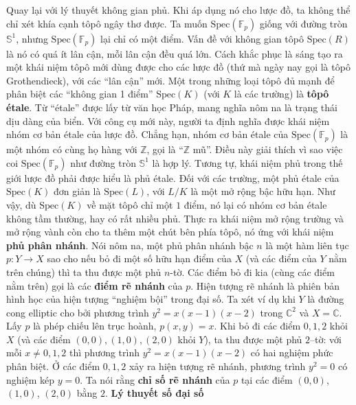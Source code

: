 \begin{multicols}{2}
	Quay lại với lý thuyết không gian phủ. Khi áp dụng nó cho lược đồ, ta không thể chỉ xét khía cạnh tôpô ngây thơ được. Ta muốn $\text{Spec}(\mathbb{F}_p)$ giống với đường tròn $\mathbb{S}^1$, nhưng $\text{Spec}(\mathbb{F}_p)$ lại chỉ có một điểm. Vấn đề với không gian tôpô $\text{Spec}(R)$ là nó có quá ít lân cận, mỗi lân cận đều quá lớn. Cách khắc phục là sáng tạo ra một khái niệm tôpô mới dùng được cho các lược đồ (thứ mà ngày nay gọi là tôpô Grothendieck), với các ``lân cận'' mới. Một trong những loại tôpô đủ mạnh để phân biệt các ``không gian 1 điểm'' $\text{Spec}(K)$ (với $K$ là các trường) là {\bf\color{duongvaotoanhoc} tôpô étale}. Từ ``étale'' được lấy từ văn học Pháp, mang nghĩa nôm na là trạng thái dịu dàng của biển. Với công cụ mới này, người ta định nghĩa được khái niệm nhóm cơ bản étale của lược đồ. Chẳng hạn, nhóm cơ bản étale của $\text{Spec}(\mathbb{F}_p)$ là một nhóm có cùng họ hàng với $\mathbb{Z}$, gọi là ``$\mathbb{Z}$ mũ''. Điều này giải thích vì sao việc coi $\text{Spec}(\mathbb{F}_p)$ như đường tròn $\mathbb{S}^1$ là hợp lý. Tương tự, khái niệm phủ trong thế giới lược đồ phải được hiểu là phủ étale. Đối với các trường, một phủ étale của $\text{Spec}(K)$ đơn giản là $\text{Spec}(L)$, với $L/K$ là một mở rộng bậc hữu hạn. Như vậy, dù $\text{Spec}(K)$ về mặt tôpô chỉ một $1$ điểm, nó lại có nhóm cơ bản étale không tầm thường, hay có rất nhiều phủ. 
	\vskip 0.1cm
	Thực ra khái niệm mở rộng trường và mở rộng vành còn cho ta thêm một chút bên phía tôpô, nó ứng với khái niệm {\bf\color{duongvaotoanhoc} phủ phân nhánh}. Nói nôm na, một phủ phân nhánh bậc $n$ là một hàm liên tục $p: Y \to X$ sao cho nếu bỏ đi một số hữu hạn điểm của $X$ (và các điểm của $Y$ nằm trên chúng) thì ta thu được một phủ $n$-tờ. Các điểm bỏ đi kia (cùng các điểm nằm trên) gọi là các {\bf\color{duongvaotoanhoc} điểm rẽ nhánh} của $p$. Hiện tượng rẽ nhánh là phiên bản hình học của hiện tượng ``nghiệm bội'' trong đại số. Ta xét ví dụ khi $Y$ là đường cong elliptic cho bởi phương trình $y^2=x(x-1)(x-2)$ trong $\mathbb{C}^2$ và $X = \mathbb{C}$. Lấy $p$ là phép chiếu lên trục hoành, $p(x,y) = x$. Khi bỏ đi các điểm $0, 1, 2$ khỏi $X$ (và các điểm $(0,0), (1,0), (2,0)$ khỏi $Y$), ta thu được một phủ $2$--tờ: với mỗi $x \neq 0,1,2$ thì phương trình $y^2=x(x-1)(x-2)$ có hai nghiệm phức phân biệt. Ở các điểm $0, 1, 2$ xảy ra hiện tượng rẽ nhánh, phương trình $y^2=0$ có nghiệm kép $y=0$. Ta nói rằng {\bf\color{duongvaotoanhoc} chỉ số rẽ nhánh} của $p$ tại các điểm $(0,0)$, $(1,0)$, $(2,0)$ bằng $2$.
	\vskip 0.1cm
	\textbf{\color{duongvaotoanhoc}Lý thuyết số đại số}
	\vskip 0.1cm

\end{multicols}
